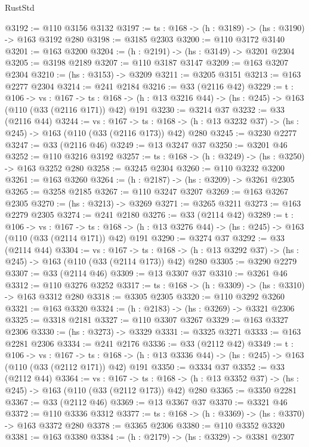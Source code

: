 \begin{lexlean}{RustStd}
\begin{coremodule}
@3192 := @110 @3156 @3132
@3197 := {ts : @168} -> (h : @3189) -> (hs : @3190) -> @163 @3192 @280
@3198 := @3185 @2303
@3200 := @110 @3172 @3140
@3201 := @163 @3200
@3204 := (h : @2191) -> (hs : @3149) -> @3201 @2304
@3205 := @3198 @2189
@3207 := @110 @3187 @3147
@3209 := @163 @3207 @2304
@3210 := (hs : @3153) -> @3209
@3211 := @3205 @3151
@3213 := @163 @2277 @2304
@3214 := @241 @2184
@3216 := @33 (@2116 @42)
@3229 := {t : @106} ->
  {vs : @167} ->
  {ts : @168} -> (h : @13 @3216 @44) -> (hs : @245) -> @163 (@110 (@33 (@2116 @171)) @42) @191
@3230 := @3214 @37
@3232 := @33 (@2116 @44)
@3244 := {vs : @167} ->
  {ts : @168} -> (h : @13 @3232 @37) -> (hs : @245) -> @163 (@110 (@33 (@2116 @173)) @42) @280
@3245 := @3230 @2277
@3247 := @33 (@2116 @46)
@3249 := @13 @3247 @37
@3250 := @3201 @46
@3252 := @110 @3216 @3192
@3257 := {ts : @168} -> (h : @3249) -> (hs : @3250) -> @163 @3252 @280
@3258 := @3245 @2304
@3260 := @110 @3232 @3200
@3261 := @163 @3260
@3264 := (h : @2187) -> (hs : @3209) -> @3261 @2305
@3265 := @3258 @2185
@3267 := @110 @3247 @3207
@3269 := @163 @3267 @2305
@3270 := (hs : @3213) -> @3269
@3271 := @3265 @3211
@3273 := @163 @2279 @2305
@3274 := @241 @2180
@3276 := @33 (@2114 @42)
@3289 := {t : @106} ->
  {vs : @167} ->
  {ts : @168} -> (h : @13 @3276 @44) -> (hs : @245) -> @163 (@110 (@33 (@2114 @171)) @42) @191
@3290 := @3274 @37
@3292 := @33 (@2114 @44)
@3304 := {vs : @167} ->
  {ts : @168} -> (h : @13 @3292 @37) -> (hs : @245) -> @163 (@110 (@33 (@2114 @173)) @42) @280
@3305 := @3290 @2279
@3307 := @33 (@2114 @46)
@3309 := @13 @3307 @37
@3310 := @3261 @46
@3312 := @110 @3276 @3252
@3317 := {ts : @168} -> (h : @3309) -> (hs : @3310) -> @163 @3312 @280
@3318 := @3305 @2305
@3320 := @110 @3292 @3260
@3321 := @163 @3320
@3324 := (h : @2183) -> (hs : @3269) -> @3321 @2306
@3325 := @3318 @2181
@3327 := @110 @3307 @3267
@3329 := @163 @3327 @2306
@3330 := (hs : @3273) -> @3329
@3331 := @3325 @3271
@3333 := @163 @2281 @2306
@3334 := @241 @2176
@3336 := @33 (@2112 @42)
@3349 := {t : @106} ->
  {vs : @167} ->
  {ts : @168} -> (h : @13 @3336 @44) -> (hs : @245) -> @163 (@110 (@33 (@2112 @171)) @42) @191
@3350 := @3334 @37
@3352 := @33 (@2112 @44)
@3364 := {vs : @167} ->
  {ts : @168} -> (h : @13 @3352 @37) -> (hs : @245) -> @163 (@110 (@33 (@2112 @173)) @42) @280
@3365 := @3350 @2281
@3367 := @33 (@2112 @46)
@3369 := @13 @3367 @37
@3370 := @3321 @46
@3372 := @110 @3336 @3312
@3377 := {ts : @168} -> (h : @3369) -> (hs : @3370) -> @163 @3372 @280
@3378 := @3365 @2306
@3380 := @110 @3352 @3320
@3381 := @163 @3380
@3384 := (h : @2179) -> (hs : @3329) -> @3381 @2307

\end{coremodule}
\end{lexlean}
